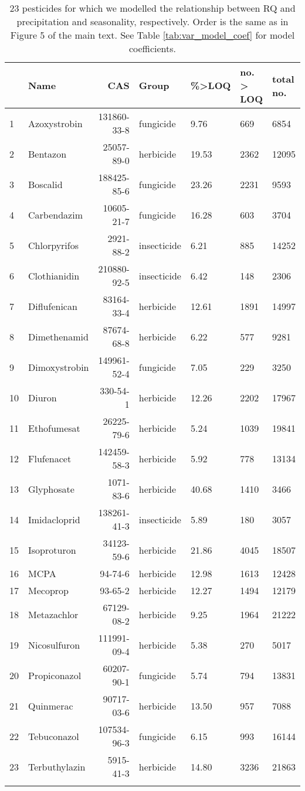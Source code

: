 \begin{longtable}{lp{2.5cm}rlp{1.5cm}p{2cm}p{2cm}}
\caption[23 pesticides for which we modelled the relationship with precipitation and seasonality.]{23 pesticides for which we modelled the relationship between RQ and precipitation and seasonality, respectively.
                    Order is the same as in Figure 5 of the main text. See Table \ref{tab:var_model_coef} for model coefficients.} \\ 
  \toprule
 & Name & CAS & Group & \%>LOQ & no. > LOQ & total no. \\ 
  \midrule
1 & Azoxystrobin & 131860-33-8 & fungicide & 9.76 & 669 & 6854 \\ 
  2 & Bentazon & 25057-89-0 & herbicide & 19.53 & 2362 & 12095 \\ 
  3 & Boscalid & 188425-85-6 & fungicide & 23.26 & 2231 & 9593 \\ 
  4 & Carbendazim & 10605-21-7 & fungicide & 16.28 & 603 & 3704 \\ 
  5 & Chlorpyrifos & 2921-88-2 & insecticide & 6.21 & 885 & 14252 \\ 
  6 & Clothianidin & 210880-92-5 & insecticide & 6.42 & 148 & 2306 \\ 
  7 & Diflufenican & 83164-33-4 & herbicide & 12.61 & 1891 & 14997 \\ 
  8 & Dimethenamid & 87674-68-8 & herbicide & 6.22 & 577 & 9281 \\ 
  9 & Dimoxystrobin & 149961-52-4 & fungicide & 7.05 & 229 & 3250 \\ 
  10 & Diuron & 330-54-1 & herbicide & 12.26 & 2202 & 17967 \\ 
  11 & Ethofumesat & 26225-79-6 & herbicide & 5.24 & 1039 & 19841 \\ 
  12 & Flufenacet & 142459-58-3 & herbicide & 5.92 & 778 & 13134 \\ 
  13 & Glyphosate & 1071-83-6 & herbicide & 40.68 & 1410 & 3466 \\ 
  14 & Imidacloprid & 138261-41-3 & insecticide & 5.89 & 180 & 3057 \\ 
  15 & Isoproturon & 34123-59-6 & herbicide & 21.86 & 4045 & 18507 \\ 
  16 & MCPA & 94-74-6 & herbicide & 12.98 & 1613 & 12428 \\ 
  17 & Mecoprop & 93-65-2 & herbicide & 12.27 & 1494 & 12179 \\ 
  18 & Metazachlor & 67129-08-2 & herbicide & 9.25 & 1964 & 21222 \\ 
  19 & Nicosulfuron & 111991-09-4 & herbicide & 5.38 & 270 & 5017 \\ 
  20 & Propiconazol & 60207-90-1 & fungicide & 5.74 & 794 & 13831 \\ 
  21 & Quinmerac & 90717-03-6 & herbicide & 13.50 & 957 & 7088 \\ 
  22 & Tebuconazol & 107534-96-3 & fungicide & 6.15 & 993 & 16144 \\ 
  23 & Terbuthylazin & 5915-41-3 & herbicide & 14.80 & 3236 & 21863 \\ 
   \bottomrule
\label{tab:var_model}
\end{longtable}
